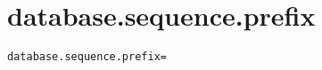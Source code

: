 \section{database.sequence.prefix}
\label{configuration:DatabaseSequencePrefix}
\ClearAPI
\TODO
{}
\begin{lstlisting}[style=Props,caption={Usage example for \textit{database.sequence.prefix}}]
database.sequence.prefix=
\end{lstlisting}